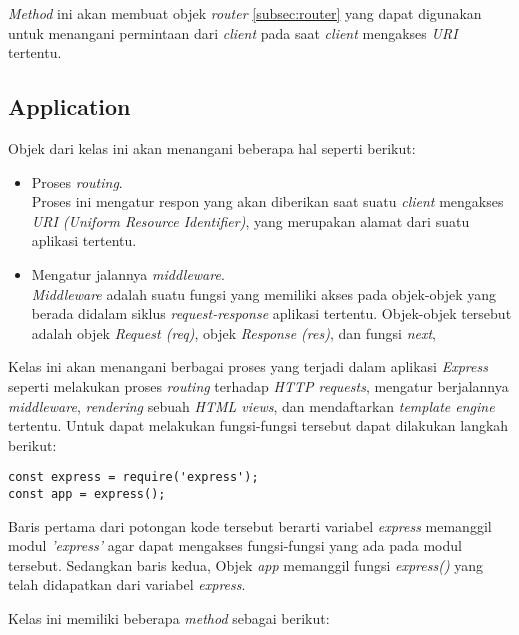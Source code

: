 \begin{itemize}
	\textit{Method} ini akan membuat objek \textit{router} \ref{subsec:router} yang dapat digunakan untuk menangani permintaan dari \textit{client} pada saat \textit{client} mengakses \textit{URI} tertentu.
	 
	
\end{itemize}

\subsection{Application}
\label{subsec:application}

Objek dari kelas ini akan menangani beberapa hal seperti berikut:

\begin{itemize}
	\item Proses \textit{routing}. \\
	Proses ini mengatur respon yang akan diberikan saat suatu \textit{client} mengakses \textit{URI (Uniform Resource Identifier)}, yang merupakan alamat dari suatu aplikasi tertentu.
	
	\item Mengatur jalannya \textit{middleware}.  \\
	\textit{Middleware} adalah suatu fungsi yang memiliki akses pada objek-objek yang berada didalam siklus \textit{request-response} aplikasi tertentu. Objek-objek tersebut adalah objek \textit{Request (req)}, objek \textit{Response (res)}, dan fungsi \textit{next},
\end{itemize}


Kelas ini akan menangani berbagai proses yang terjadi dalam aplikasi \textit{Express} seperti melakukan proses \textit{routing} terhadap \textit{HTTP requests}, mengatur berjalannya \textit{middleware}, \textit{rendering} sebuah \textit{HTML views}, dan mendaftarkan \textit{template engine} tertentu. Untuk dapat melakukan fungsi-fungsi tersebut dapat dilakukan langkah berikut:

\begin{lstlisting}
const express = require('express');
const app = express();
\end{lstlisting}

Baris pertama dari potongan kode tersebut berarti variabel \textit{express} memanggil modul \textit{'express'} agar dapat mengakses fungsi-fungsi yang ada pada modul tersebut. Sedangkan baris kedua, Objek \textit{app} memanggil fungsi \textit{express()} yang telah didapatkan dari variabel \textit{express}.

Kelas ini memiliki beberapa \textit{method} sebagai berikut:

